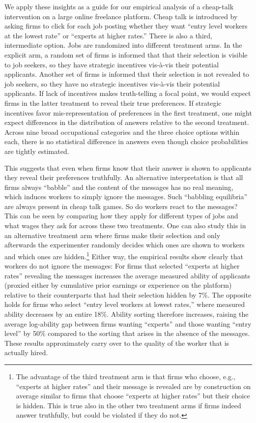 \documentclass[12pt]{article}
\begin{document}
 
We apply these insights as a guide for our empirical analysis of a cheap-talk intervention on a large online freelance platform. Cheap talk is introduced by asking firms to click for each job posting whether they want ``entry level workers at the lowest rate'' or ``experts at higher rates.'' There is also a third, intermediate option. Jobs are randomized into different treatment arms. In the explicit arm, a random set of firms is informed that that their selection is visible to job seekers, so they have strategic incentives vis-\`a-vis their potential applicants. Another set of firms is informed that their selection is not revealed to job seekers, so they have no strategic incentives vis-\`a-vis their potential applicants. If lack of incentives makes truth-telling a focal point, we would expect firms in the latter treatment to reveal their true preferences. If strategic incentives favor mis-representation of preferences in the first treatment, one might expect differences in the distribution of answers relative to the second treatment. Across nine broad occupational categories and the three choice options within each, there is no statistical difference in answers even though choice probabilities are tightly estimated. 

This suggests that even when firms know that their answer is shown to applicants they reveal their preferences truthfully. An alternative interpretation is that all firms always ``babble'' and the content of the messages has no real meaning, which induces workers to simply ignore the messages. Such ``babbling equilibria'' are always present in cheap talk games. So do workers react to the messages? This can be seen by comparing how they apply for different types of jobs and what wages they ask for across these two treatments. One can also study this in an alternative treatment arm where firms make their selection and only afterwards the experimenter randomly decides which ones are shown to workers and which ones are hidden.\footnote{The advantage of the third treatment arm is that firms who choose, e.g., ``experts at higher rates'' and their message is revealed are by construction on average similar to firms that choose ``experts at higher rates'' but their choice is hidden. This is true also in the other two treatment arms if firms indeed answer truthfully, but could be violated if they do not.} Either way, the empirical results show clearly that workers do not ignore the messages: For firms that selected ``experts at higher rates'' revealing the messages increases the average measured ability of applicants (proxied either by cumulative prior earnings or experience on the platform) relative to their counterparts that had their selection hidden by 7\%. The opposite holds for firms who select ``entry level workers at lowest rates,'' where measured ability decreases by an entire 18\%. Ability sorting therefore increases, raising the average log-ability gap between firms wanting ``experts'' and those wanting ``entry level'' by 50\% compared to the sorting that arises in the absence of the messages. These results approximately carry over to the quality of the worker that is actually hired.
\end{document}
